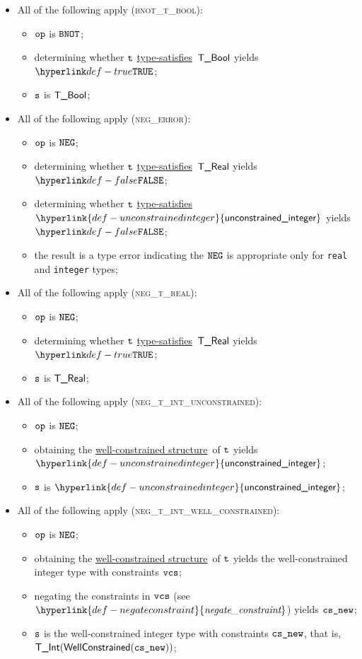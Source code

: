 \documentclass{book}
\newcommand\ProseOrTypeError[0]{\ProseTerminateAs{\TypeErrorConfig}}
\newcommand\unconstrainedinteger[0]{\hyperlink{def-unconstrainedinteger}{\textsf{unconstrained\_integer}}}
\newcommand\negateconstraint[0]{\hyperlink{def-negateconstraint}{\textfunc{negate\_constraint}}}
\newcommand\typesatisfies[0]{\hyperlink{def-typesatisfies}{type-satisfies}}
\newcommand\wellconstrainedstructure[0]{\hyperlink{def-getwellconstrainedstructure}{well-constrained structure}}
\begin{document}
\begin{itemize}
\item All of the following apply (\textsc{bnot\_t\_bool}):
  \begin{itemize}
    \item $\texttt{op}$ is $\texttt{BNOT}$;
    \item determining whether $\texttt{t}$ \typesatisfies\ $\textsf{T\_Bool}$ yields $\True$\ProseOrTypeError;
    \item $\texttt{s}$ is $\textsf{T\_Bool}$;
  \end{itemize}

\item All of the following apply (\textsc{neg\_error}):
\begin{itemize}
  \item $\texttt{op}$ is $\texttt{NEG}$;
  \item determining whether $\texttt{t}$ \typesatisfies\ $\textsf{T\_Real}$ yields $\False$\ProseOrTypeError;
  \item determining whether $\texttt{t}$ \typesatisfies\ $\unconstrainedinteger$ yields $\False$\ProseOrTypeError;
  \item the result is a type error indicating the $\texttt{NEG}$ is appropriate only for \texttt{real} and \texttt{integer} types;
\end{itemize}

\item All of the following apply (\textsc{neg\_t\_real}):
\begin{itemize}
  \item $\texttt{op}$ is $\texttt{NEG}$;
  \item determining whether $\texttt{t}$ \typesatisfies\ $\textsf{T\_Real}$ yields $\True$;
  \item $\texttt{s}$ is $\textsf{T\_Real}$;
\end{itemize}

\item All of the following apply (\textsc{neg\_t\_int\_unconstrained}):
\begin{itemize}
  \item $\texttt{op}$ is $\texttt{NEG}$;
  \item obtaining the \wellconstrainedstructure\ of $\texttt{t}$ yields $\unconstrainedinteger$\ProseOrTypeError;
  \item $\texttt{s}$ is $\unconstrainedinteger$;
\end{itemize}

\item All of the following apply (\textsc{neg\_t\_int\_well\_constrained}):
\begin{itemize}
  \item $\texttt{op}$ is $\texttt{NEG}$;
  \item obtaining the \wellconstrainedstructure\ of $\texttt{t}$ yields the well-constrained integer type with constraints $\texttt{vcs}$\ProseOrTypeError;
  \item negating the constraints in $\texttt{vcs}$ (see $\negateconstraint$) yields $\texttt{cs\_new}$;
  \item $\texttt{s}$ is the well-constrained integer type with constraints $\texttt{cs\_new}$, that is, \\
  $\textsf{T\_Int}(\textsf{WellConstrained}(\texttt{cs\_new}))$;
\end{itemize}


\end{itemize}
\end{document}
